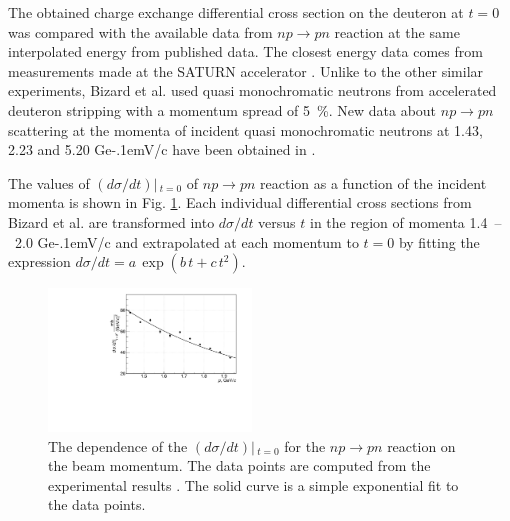 \documentclass[twocolumn,epjc3]{svjour3}
\newcommand{\np}     {\ensuremath{np \rightarrow pn}\xspace}
\newcommand{\GeVc}   {Ge\kern-.1emV/c\xspace}
\begin{document}

The obtained charge exchange differential cross section on the deuteron at $t=0$
was compared with the available data from \np reaction at the same interpolated
energy from published data. The closest energy data comes from measurements made
at the SATURN accelerator \cite{biz75,bys78}. Unlike to the other similar
experiments, Bizard et al. \cite{biz75} used quasi monochromatic neutrons from
accelerated deuteron stripping with a momentum spread of 5~\%. New data about
\np scattering at the momenta of incident quasi monochromatic neutrons at 1.43,
2.23 and 5.20 \GeVc have been obtained in \cite{tro14}.

The values of $(d\sigma/dt)|\,_{t=0}$ of \np reaction as a function of the
incident momenta is shown in Fig. \ref{fig:npsigma}. Each individual
differential cross sections from Bizard et al. \cite{biz75} are transformed into
$d\sigma/dt$ versus $t$ in the region of momenta 1.4~--~2.0 \GeVc and
extrapolated at each momentum to $t=0$ by fitting the expression
$d\sigma/dt = a\,\exp(b\,t + c\,t^2)$.

\begin{figure}[ht]
  \centering
  \includegraphics[width=0.48\textwidth]{np_dSigma.pdf}
  \caption{The dependence of the $(d\sigma/dt)|\,_{t=0}$ for the \np reaction on
    the beam momentum. The data points are computed from the experimental
    results \cite{biz75}. The solid curve is a simple exponential fit to the
    data points.}
  \label{fig:npsigma}
\end{figure}
\end{document}
